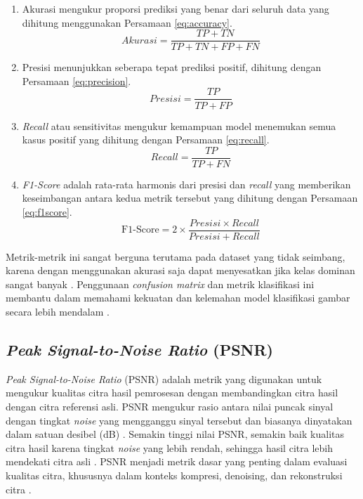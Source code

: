 \begin{enumerate}[nolistsep]
	\item Akurasi mengukur proporsi prediksi yang benar dari seluruh data yang dihitung menggunakan Persamaan \ref{eq:accuracy}.
	\begin{equation}
		Akurasi=\frac{TP+TN}{TP+TN+FP+FN}
		\label{eq:accuracy}
	\end{equation}
	
	\item Presisi menunjukkan seberapa tepat prediksi positif, dihitung dengan Persamaan \ref{eq:precision}.
	\begin{equation}
		Presisi=\frac{TP}{TP+FP}
		\label{eq:precision}
	\end{equation} 
	
	\item \textit{Recall} atau sensitivitas mengukur kemampuan model menemukan semua kasus positif yang dihitung dengan Persamaan \ref{eq:recall}.
	\begin{equation}
		Recall=\frac{TP}{TP+FN}
		\label{eq:recall}
	\end{equation}
	
	\item \textit{F1-Score} adalah rata-rata harmonis dari presisi dan \textit{recall} yang memberikan keseimbangan antara kedua metrik tersebut yang dihitung dengan Persamaan \ref{eq:f1score}.
	\begin{equation}
		\text{F1-Score} = 2 \times \frac{Presisi \times Recall}{Presisi+Recall}
		\label{eq:f1score}
	\end{equation}
	
\end{enumerate}

Metrik-metrik ini sangat berguna terutama pada dataset yang tidak seimbang, karena dengan menggunakan akurasi saja dapat menyesatkan jika kelas dominan sangat banyak \citep{Salmanpour2025}. Penggunaan \textit{confusion matrix} dan metrik klasifikasi ini membantu dalam memahami kekuatan dan kelemahan model klasifikasi gambar secara lebih mendalam \citep{Simhadri2025}.

\subsection{\textit{Peak Signal-to-Noise Ratio} (PSNR)}

\textit{Peak Signal-to-Noise Ratio} (PSNR) adalah metrik yang digunakan untuk mengukur kualitas citra hasil pemrosesan dengan membandingkan citra hasil dengan citra referensi asli. PSNR mengukur rasio antara nilai puncak sinyal dengan tingkat \textit{noise} yang mengganggu sinyal tersebut dan biasanya dinyatakan dalam satuan desibel (dB) \citep{Sara2019}. Semakin tinggi nilai PSNR, semakin baik kualitas citra hasil karena tingkat \textit{noise} yang lebih rendah, sehingga hasil citra lebih mendekati citra asli \citep{Li2025}. PSNR menjadi metrik dasar yang penting dalam evaluasi kualitas citra, khususnya dalam konteks kompresi, denoising, dan rekonstruksi citra \citep{Sara2019}.

